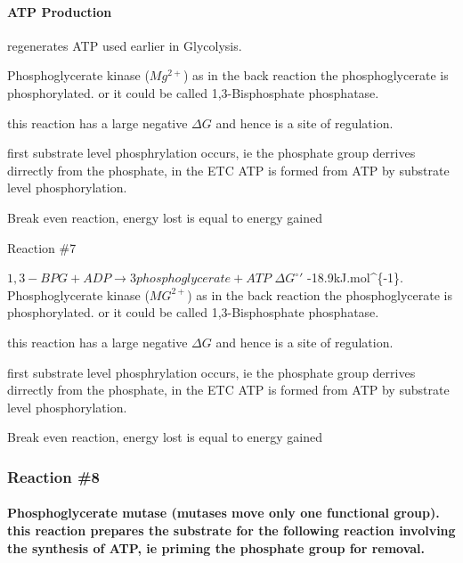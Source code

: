 \documentclass[]{article}
\let\oldparagraph\paragraph
\renewcommand{\paragraph}[1]{\oldparagraph{#1}\mbox{}}
\begin{document}
\hypertarget{atp-production}{%
\paragraph{ATP Production}\label{atp-production}}

regenerates ATP used earlier in Glycolysis.

Phosphoglycerate kinase (\(Mg^{2+}\)) as in the back reaction the
phosphoglycerate is phosphorylated. or it could be called
1,3-Bisphosphate phosphatase.

this reaction has a large negative \(\Delta G\) and hence is a site of
regulation.

first substrate level phosphrylation occurs, ie the phosphate group
derrives dirrectly from the phosphate, in the ETC ATP is formed from ATP
by substrate level phosphorylation.

Break even reaction, energy lost is equal to energy gained

Reaction \#7

\(1,3-BPG+ADP \rightarrow 3 phosphoglycerate+ATP\) \(\Delta G^\circ '\)
-18.9kJ.mol\^{}\{-1\}. Phosphoglycerate kinase (\(MG^{2+}\)) as in the
back reaction the phosphoglycerate is phosphorylated. or it could be
called 1,3-Bisphosphate phosphatase.

this reaction has a large negative \(\Delta G\) and hence is a site of
regulation.

first substrate level phosphrylation occurs, ie the phosphate group
derrives dirrectly from the phosphate, in the ETC ATP is formed from ATP
by substrate level phosphorylation.

Break even reaction, energy lost is equal to energy gained

\hypertarget{reaction-8}{%
\subsubsection{Reaction \#8}\label{reaction-8}}

\hypertarget{phosphoglycerate-mutase-mutases-move-only-one-functional-group.-this-reaction-prepares-the-substrate-for-the-following-reaction-involving-the-synthesis-of-atp-ie-priming-the-phosphate-group-for-removal.}{%
\paragraph{Phosphoglycerate mutase (mutases move only one functional
group). this reaction prepares the substrate for the following reaction
involving the synthesis of ATP, ie priming the phosphate group for
removal.}\label{phosphoglycerate-mutase-mutases-move-only-one-functional-group.-this-reaction-prepares-the-substrate-for-the-following-reaction-involving-the-synthesis-of-atp-ie-priming-the-phosphate-group-for-removal.}}
\end{document}

